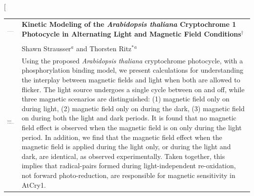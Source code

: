 \documentclass[twoside,twocolumn,9pt]{article}
\begin{document}
\twocolumn[
  \begin{@twocolumnfalse}
\vspace{3cm}
\sffamily
\begin{tabular}{m{4.5cm} p{13.5cm} }

\includegraphics{head_foot/DOI} & \noindent\LARGE{\textbf{Kinetic Modeling of the \textit{Arabidopsis thaliana} Cryptochrome 1 Photocycle in Alternating Light and Magnetic Field Conditions$^\dag$}} \\%
\vspace{0.3cm} & \vspace{0.3cm} \\

 & \noindent\large{Shawn Strausser\textit{$^{a}$} and Thorsten Ritz$^{\ast}$\textit{$^{a}$}} \\%

\includegraphics{head_foot/dates} & \noindent\normalsize{Using the proposed \textit{Arabidopsis thaliana} cryptochrome photocycle, with a phosphorylation binding model, we present calculations for understanding the interplay between magnetic fields and light when both are allowed to flicker. The light source undergoes a single cycle  between on and off, while three magnetic scenarios are distinguished: (1) magnetic field only on during light, (2) magnetic field only on during the dark, (3) magnetic field on during both the light and dark periods. It is found that no magnetic field effect is observed when the magnetic field is on only during the light period. In addition, we find that the magnetic field effect when the magnetic field is applied during the light only, or during the light and dark, are identical, as observed experimentally. Taken together, this implies that radical-pairs formed during light-independent re-oxidation, not forward photo-reduction, are responsible for magnetic sensitivity in AtCry1.} \\%
	

\end{tabular}
\end{@twocolumnfalse}
\end{document}
